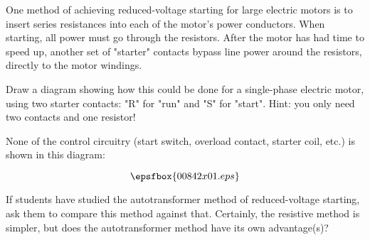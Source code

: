 

One method of achieving reduced-voltage starting for large electric motors is to insert series resistances into each of the motor's power conductors.  When starting, all power must go through the resistors.  After the motor has had time to speed up, another set of "starter" contacts bypass line power around the resistors, directly to the motor windings.

Draw a diagram showing how this could be done for a single-phase electric motor, using two starter contacts: "R" for "run" and "S" for "start".  Hint: you only need two contacts and one resistor!







None of the control circuitry (start switch, overload contact, starter coil, etc.) is shown in this diagram:

$$\epsfbox{00842x01.eps}$$







If students have studied the autotransformer method of reduced-voltage starting, ask them to compare this method against that.  Certainly, the resistive method is simpler, but does the autotransformer method have its own advantage(s)?



